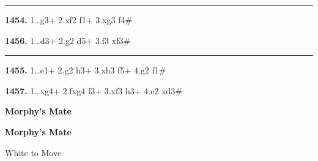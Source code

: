 \documentclass[12pt,twoside]{article}
\begin{document}
\noindent\rule{\textwidth}{0.4pt}

\vspace{0.15em}

\noindent{}

\vspace{0.75em}

{\footnotesize\sloppy
\noindent
\begin{minipage}[t]{\textwidth}
    \begin{minipage}[c]{0.47\textwidth}
{\bfseries 1454.} 1\ldots \symknight{}g3+ 2.\symking{}xf2 \symqueen{}f1+ 3.\symking{}xg3 \symqueen{}f4\#
        \vspace{0.45em}

{\bfseries 1456.} 1\ldots \symqueen{}d3+ 2.\symking{}g2 \symbishop{}d5+ 3.f3 \symqueen{}xf3\#    \end{minipage}
        \hfill
    \begin{minipage}[c][4.9\baselineskip][c]{0.02\textwidth}
        \centering\rule{0.4pt}{4.7\baselineskip}
    \end{minipage}
    \hfill
    \begin{minipage}[c]{0.47\textwidth}
{\bfseries 1455.} 1\ldots \symrook{}e1+ 2.\symking{}g2 \symbishop{}h3+ 3.\symking{}xh3 \symqueen{}f5+ 4.\symking{}g2 \symqueen{}f1\#
        \vspace{0.45em}

{\bfseries 1457.} 1\ldots \symrook{}xg4+ 2.fxg4 f3+ 3.\symking{}xf3 \symqueen{}h3+ 4.\symking{}e2 \symqueen{}xd3\#    \end{minipage}
\end{minipage}
}
\newpage\cleardoublepage

\thispagestyle{empty}

\vspace*{0.34\textheight}

\begin{center}
{\Huge\bfseries Morphy's Mate\par}
\end{center}

\vfill
{}
\newpage\null\thispagestyle{empty}\newpage

\begin{center}
\Large\bfseries Morphy's Mate

\vspace{0.15em}
\normalsize White to Move
\end{center}
\end{document}
